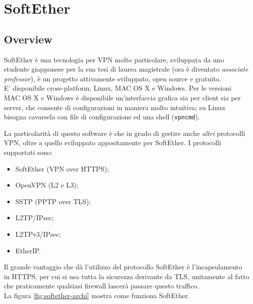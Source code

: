 \section{SoftEther}
\subsection{Overview}
SoftEther è una tecnologia per VPN molto particolare, sviluppata da uno studente
giapponese per la sua tesi di laurea magistrale (ora è diventato \textit{associate professor}),
è un progetto
attivamente sviluppato, open source e gratuito.\\
E' disponibile cross-platform, Linux, MAC OS X e Windows. Per
le versioni MAC OS X e Windows è disponibile un'interfaccia grafica sia per client
sia per server, che consente di configurazioni in maniera molto intuitiva; su Linux
bisogna cavarsela con file di configurazione ed una shell (\texttt{vpncmd}).


La particolarità di questo software è che in grado di gestire anche \textit{altri}
protocolli VPN, oltre a quello sviluppato appositamente per SoftEther.
I protocolli supportati sono:
\begin{itemize}
  \item SoftEther (VPN over HTTPS);
  \item OpenVPN (L2  e L3);
  \item SSTP (PPTP over TLS);
  \item L2TP/IPsec;
  \item L2TPv3/IPsec;
  \item EtherIP.
\end{itemize}
Il grande vantaggio che dà l'utilizzo del protocollo SoftEther è l'incapsulamento in
HTTPS, per cui si usa tutta la sicurezza derivante da TLS, unitamente al fatto che
praticamente qualsiasi firewall lascerà passare questo traffico.\\
La figura \ref{fig:softether-archi} mostra come funziona SoftEther.


